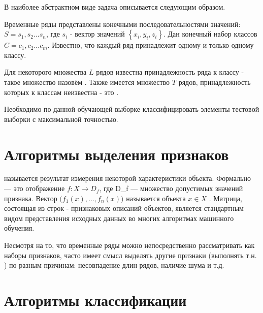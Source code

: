 В наиболее абстрактном виде задача описывается следующим образом. 

Временные ряды представлены конечными последовательностями значений: $S=s_1,s_2...s_n$, где $s_i$ - вектор значений $\left\{x_i,y_i,z_i\right\}$. Дан конечный набор классов $C=c_1,c_2...c_m$. Известно, что каждый ряд принадлежит одному и только одному классу. 

Для некоторого множества $L$ рядов известна принадлежность ряда к классу - такое множество назовём . Также имеется множество $T$ рядов, принадлежность которых к классам неизвестна - это .

Необходимо по данной обучающей выборке классифицировать элементы тестовой выборки с максимальной точностью.


\section{Алгоритмы выделения признаков}

 называется результат измерения некоторой характеристики объекта. Формально  — это отображение $f: X\to D_f $, где D\_f — множество допустимых значений признака. Вектор $\bigl( f_1(x),\ldots,f_n(x) \bigr)$ называется  объекта $x \in X$ \cite{features_def}. Матрица, состоящая из строк - признаковых описаний объектов, является стандартным видом представления исходных данных во многих алгоритмах машинного обучения. 

Несмотря на то, что временные ряды можно непосредственно рассматривать как наборы признаков, часто имеет смысл выделять другие признаки (выполнять т.н. ) по разным причинам: несовпадение длин рядов, наличие шума и т.д.







\section{Алгоритмы классификации}







